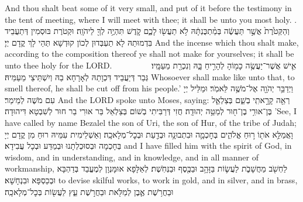 {{And thou shalt beat some of it very small, and put of it before the testimony in the tent of meeting, where I will meet with thee; it shall be unto you most holy. .}{}
{וְהַקְּטֹ֙רֶת֙ אֲשֶׁ֣ר תַּעֲשֶׂ֔ה בְּמַ֨תְכֻּנְתָּ֔הּ לֹ֥א תַעֲשׂ֖וּ לָכֶ֑ם קֹ֛דֶשׁ תִּהְיֶ֥ה לְךָ֖ לַיהֹוָֽה׃
}
{וּקְטֹרֶת בּוּסְמִין דְּתַעֲבֵיד בִּדְמוּתַהּ לָא תַעְבְּדוּן לְכוֹן קוּדְשָׁא תְּהֵי לָךְ קֳדָם יְיָ׃}
{And the incense which thou shalt make, according to the composition thereof ye shall not make for yourselves; it shall be unto thee holy for the LORD.}{}
{אִ֛ישׁ אֲשֶׁר־יַעֲשֶׂ֥ה כָמ֖וֹהָ לְהָרִ֣יחַ בָּ֑הּ וְנִכְרַ֖ת מֵעַמָּֽיו׃ \setuma         
}
{גְּבַר דְּיַעֲבֵיד דִּכְוָתַהּ לְאָרָחָא בַהּ וְיִשְׁתֵּיצֵי מֵעַמֵּיהּ׃}
{Whosoever shall make like unto that, to smell thereof, he shall be cut off from his people.’}{}
\newperek
{}%
{וַיְדַבֵּ֥ר יְהֹוָ֖ה אֶל־מֹשֶׁ֥ה לֵּאמֹֽר׃}
{וּמַלֵּיל יְיָ עִם מֹשֶׁה לְמֵימַר׃}
{And the LORD spoke unto Moses, saying:}{}
{רְאֵ֖ה קָרָ֣אתִֽי בְשֵׁ֑ם בְּצַלְאֵ֛ל בֶּן־אוּרִ֥י בֶן־ח֖וּר לְמַטֵּ֥ה יְהוּדָֽה׃
}
{חֲזִי דְּרַבִּיתִי בְשׁוֹם בְּצַלְאֵל בַּר אוּרִי בַר חוּר לְשִׁבְטָא דִּיהוּדָה׃}
{’See, I have called by name Bezalel the son of Uri, the son of Hur, of the tribe of Judah;}{}
{וָאֲמַלֵּ֥א אֹת֖וֹ ר֣וּחַ אֱלֹהִ֑ים בְּחׇכְמָ֛ה וּבִתְבוּנָ֥ה וּבְדַ֖עַת וּבְכׇל־מְלָאכָֽה׃
}
{וְאַשְׁלֵימִית עִמֵּיהּ רוּחַ מִן קֳדָם יְיָ בְּחָכְמָה וּבְסוּכְלְתָנוּ וּבְמַדַּע וּבְכָל עֲבִידָא׃}
{and I have filled him with the spirit of God, in wisdom, and in understanding, and in knowledge, and in all manner of workmanship,}{}
{לַחְשֹׁ֖ב מַחֲשָׁבֹ֑ת לַעֲשׂ֛וֹת בַּזָּהָ֥ב וּבַכֶּ֖סֶף וּבַנְּחֹֽשֶׁת׃
}
{לְאַלָּפָא אוּמָּנְוָן לְמֶעֱבַד בְּדַהְבָּא וּבְכַסְפָּא וּבִנְחָשָׁא׃}
{to devise skilful works, to work in gold, and in silver, and in brass,}{}
{וּבַחֲרֹ֥שֶׁת אֶ֛בֶן לְמַלֹּ֖את וּבַחֲרֹ֣שֶׁת עֵ֑ץ לַעֲשׂ֖וֹת בְּכׇל־מְלָאכָֽה׃
}}
